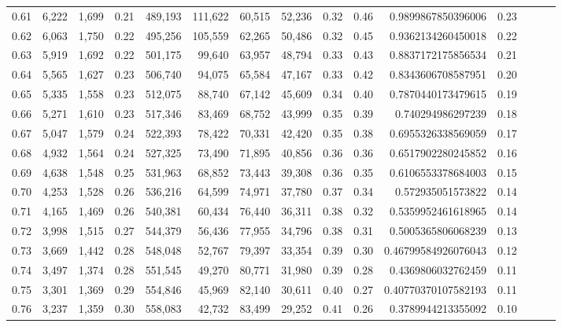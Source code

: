 \begin{tabular}{rrrrrrrrrrrrrrr}
0.61 &   6,222 &  1,699 &  0.21 &  489,193 &  111,622 &   60,515 &   52,236 &  0.32 &  0.46 &    0.9899867850396006 &      0.23 \\
0.62 &   6,063 &  1,750 &  0.22 &  495,256 &  105,559 &   62,265 &   50,486 &  0.32 &  0.45 &    0.9362134260450018 &      0.22 \\
0.63 &   5,919 &  1,692 &  0.22 &  501,175 &   99,640 &   63,957 &   48,794 &  0.33 &  0.43 &    0.8837172175856534 &      0.21 \\
0.64 &   5,565 &  1,627 &  0.23 &  506,740 &   94,075 &   65,584 &   47,167 &  0.33 &  0.42 &    0.8343606708587951 &      0.20 \\
0.65 &   5,335 &  1,558 &  0.23 &  512,075 &   88,740 &   67,142 &   45,609 &  0.34 &  0.40 &    0.7870440173479615 &      0.19 \\
0.66 &   5,271 &  1,610 &  0.23 &  517,346 &   83,469 &   68,752 &   43,999 &  0.35 &  0.39 &     0.740294986297239 &      0.18 \\
0.67 &   5,047 &  1,579 &  0.24 &  522,393 &   78,422 &   70,331 &   42,420 &  0.35 &  0.38 &    0.6955326338569059 &      0.17 \\
0.68 &   4,932 &  1,564 &  0.24 &  527,325 &   73,490 &   71,895 &   40,856 &  0.36 &  0.36 &    0.6517902280245852 &      0.16 \\
0.69 &   4,638 &  1,548 &  0.25 &  531,963 &   68,852 &   73,443 &   39,308 &  0.36 &  0.35 &    0.6106553378684003 &      0.15 \\
0.70 &   4,253 &  1,528 &  0.26 &  536,216 &   64,599 &   74,971 &   37,780 &  0.37 &  0.34 &     0.572935051573822 &      0.14 \\
0.71 &   4,165 &  1,469 &  0.26 &  540,381 &   60,434 &   76,440 &   36,311 &  0.38 &  0.32 &    0.5359952461618965 &      0.14 \\
0.72 &   3,998 &  1,515 &  0.27 &  544,379 &   56,436 &   77,955 &   34,796 &  0.38 &  0.31 &    0.5005365806068239 &      0.13 \\
0.73 &   3,669 &  1,442 &  0.28 &  548,048 &   52,767 &   79,397 &   33,354 &  0.39 &  0.30 &   0.46799584926076043 &      0.12 \\
0.74 &   3,497 &  1,374 &  0.28 &  551,545 &   49,270 &   80,771 &   31,980 &  0.39 &  0.28 &    0.4369806032762459 &      0.11 \\
0.75 &   3,301 &  1,369 &  0.29 &  554,846 &   45,969 &   82,140 &   30,611 &  0.40 &  0.27 &   0.40770370107582193 &      0.11 \\
0.76 &   3,237 &  1,359 &  0.30 &  558,083 &   42,732 &   83,499 &   29,252 &  0.41 &  0.26 &    0.3789944213355092 &      0.10 \\

\end{tabular}
